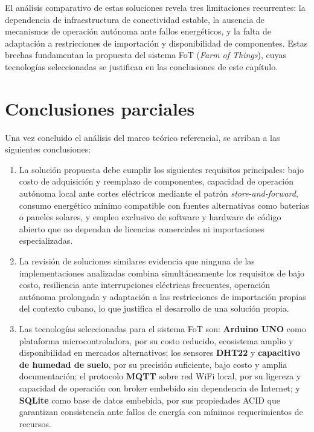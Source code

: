 El análisis comparativo de estas soluciones revela tres limitaciones recurrentes: la dependencia de infraestructura de conectividad estable, la ausencia de mecanismos de operación autónoma ante fallos energéticos, y la falta de adaptación a restricciones de importación y disponibilidad de componentes. Estas brechas fundamentan la propuesta del sistema FoT (\emph{Farm of Things}), cuyas tecnologías seleccionadas se justifican en las conclusiones de este capítulo.

\section{Conclusiones parciales}\label{sec:conclusiones-cap1}

Una vez concluido el análisis del marco teórico referencial, se arriban a las siguientes conclusiones:

\begin{enumerate}
	\setlength\itemsep{0em}
	\item La solución propuesta debe cumplir los siguientes requisitos principales: bajo costo de adquisición y reemplazo de componentes, capacidad de operación autónoma local ante cortes eléctricos mediante el patrón \emph{store-and-forward}, consumo energético mínimo compatible con fuentes alternativas como baterías o paneles solares, y empleo exclusivo de software y hardware de código abierto que no dependan de licencias comerciales ni importaciones especializadas.
	\item La revisión de soluciones similares evidencia que ninguna de las implementaciones analizadas combina simultáneamente los requisitos de bajo costo, resiliencia ante interrupciones eléctricas frecuentes, operación autónoma prolongada y adaptación a las restricciones de importación propias del contexto cubano, lo que justifica el desarrollo de una solución propia.
	\item Las tecnologías seleccionadas para el sistema FoT son: \textbf{Arduino UNO} como plataforma microcontroladora, por su costo reducido, ecosistema amplio y disponibilidad en mercados alternativos; los sensores \textbf{DHT22} y \textbf{capacitivo de humedad de suelo}, por su precisión suficiente, bajo costo y amplia documentación; el protocolo \textbf{MQTT} sobre red WiFi local, por su ligereza y capacidad de operación con broker embebido sin dependencia de Internet; y \textbf{SQLite} como base de datos embebida, por sus propiedades ACID que garantizan consistencia ante fallos de energía con mínimos requerimientos de recursos.
\end{enumerate}

\pagebreak